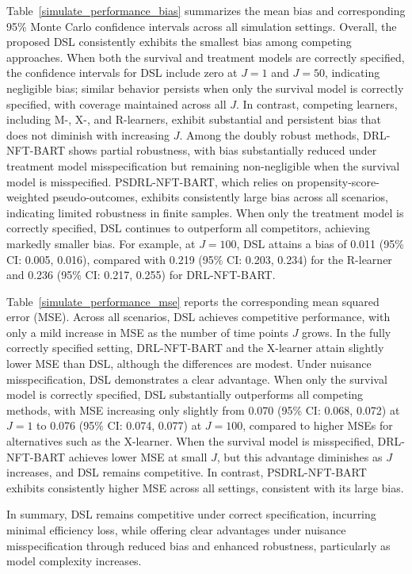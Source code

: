 \documentclass{article}
\begin{document}
 {Table~\ref{simulate_performance_bias} summarizes the mean bias and corresponding 95\% Monte Carlo confidence intervals across all simulation settings. Overall, the proposed DSL consistently exhibits the smallest bias among competing approaches. When both the survival and treatment models are correctly specified, the confidence intervals for DSL include zero at \(J=1\) and \(J=50\), indicating negligible bias; similar behavior persists when only the survival model is correctly specified, with coverage maintained across all \(J\). In contrast, competing learners, including M-, X-, and R-learners, exhibit substantial and persistent bias that does not diminish with increasing \(J\). Among the doubly robust methods, DRL-NFT-BART shows partial robustness, with bias substantially reduced under treatment model misspecification but remaining non-negligible when the survival model is misspecified. PSDRL-NFT-BART, which relies on propensity-score-weighted pseudo-outcomes, exhibits consistently large bias across all scenarios, indicating limited robustness in finite samples. When only the treatment model is correctly specified, DSL continues to outperform all competitors, achieving markedly smaller bias. For example, at \(J=100\), DSL attains a bias of 0.011 (95\% CI: 0.005, 0.016), compared with 0.219 (95\% CI: 0.203, 0.234) for the R-learner and 0.236 (95\% CI: 0.217, 0.255) for DRL-NFT-BART.}

    {Table~\ref{simulate_performance_mse} reports the corresponding mean squared error (MSE). Across all scenarios, DSL achieves competitive performance, with only a mild increase in MSE as the number of time points \(J\) grows. In the fully correctly specified setting, DRL-NFT-BART and the X-learner attain slightly lower MSE than DSL, although the differences are modest. Under nuisance misspecification, DSL demonstrates a clear advantage. When only the survival model is correctly specified, DSL substantially outperforms all competing methods, with MSE increasing only slightly from 0.070 (95\% CI: 0.068, 0.072) at \(J=1\) to 0.076 (95\% CI: 0.074, 0.077) at \(J=100\), compared to higher MSEs for alternatives such as the X-learner. When the survival model is misspecified, DRL-NFT-BART achieves lower MSE at small \(J\), but this advantage diminishes as \(J\) increases, and DSL remains competitive. In contrast, PSDRL-NFT-BART exhibits consistently higher MSE across all settings, consistent with its large bias.}

{ In summary, DSL remains competitive under correct specification, incurring minimal efficiency loss, while offering clear advantages under nuisance misspecification through reduced bias and enhanced robustness, particularly as model complexity increases.}
\end{document}
